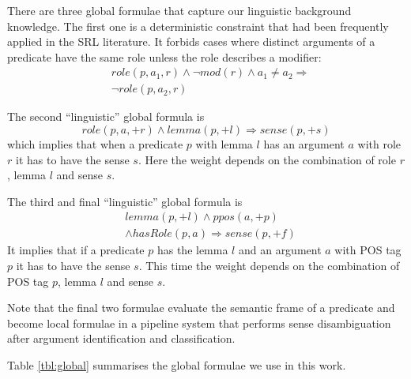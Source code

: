 There are three global formulae that capture our linguistic background knowledge. The first one is a deterministic constraint that had been frequently applied in the SRL literature. It forbids cases where distinct arguments of a predicate have the same role unless the role describes a modifier:
\begin{eqnarray*}
 &role\left(p,a_{1},r\right)\wedge \neg mod\left(r\right)\wedge a_{1}\neq a_{2}  \Rightarrow\\
  & \neg role\left(p,a_{2},r\right)
\end{eqnarray*}

The second ``linguistic'' global formula is
\[
role(p,a,+r) \wedge lemma(p,+l) \Rightarrow sense(p,+s) 
\]
which implies that when a predicate $p$ with lemma $l$ has an argument $a$ with role $r$ it has to have the sense $s$. Here the weight depends on the combination of role $r$, lemma $l$ and sense $s$.

The third and final ``linguistic'' global formula is
\begin{eqnarray*}
  & lemma(p,+l) \wedge ppos(a,+p)  \\
  & \wedge hasRole(p,a)  \Rightarrow sense(p,+f) 
\end{eqnarray*}
It implies that if a predicate $p$ has the lemma $l$ and an argument $a$ with POS tag $p$ it has to have the sense $s$. This time the weight depends on the combination of POS tag $p$, lemma $l$ and sense $s$.

Note that the final two formulae evaluate the semantic frame of a predicate and become local formulae in a pipeline system that performs sense disambiguation after argument identification and classification.

Table \ref{tbl:global} summarises the global formulae we use in this work. 

